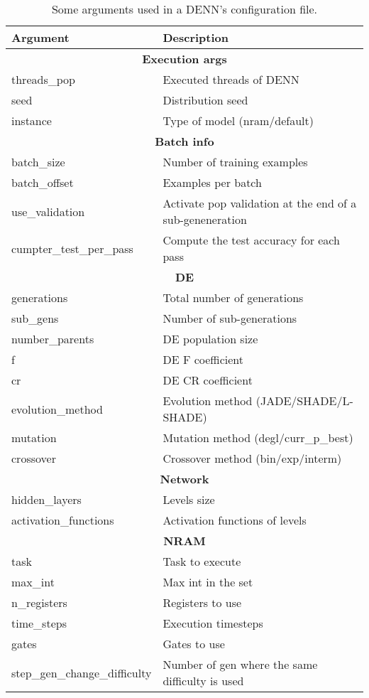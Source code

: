 \begin{table}[]
\centering
\label{my-label}
\begin{tabular}{|l|l|}
\hline
Argument     & Description \\ \hline \hline

\multicolumn{2}{|c|}{\textbf{Execution args}} \\ \hline
threads\_pop & Executed threads of DENN \\ \hline
seed     	 & Distribution seed \\ \hline
instance		 & Type of model (nram/default) \\ \hline \hline

\multicolumn{2}{|c|}{\textbf{Batch info}} \\ \hline
batch\_size  	 & Number of training examples \\ \hline
batch\_offset	 & Examples per batch \\ \hline
use\_validation & Activate pop validation at the end of a sub-geneneration \\ \hline
cumpter\_test\_per\_pass     	 & Compute the test accuracy for each pass \\ \hline \hline

\multicolumn{2}{|c|}{\textbf{DE}} \\ \hline
generations  	 & Total number of generations \\ \hline
sub\_gens  	 	& Number of sub-generations \\ \hline
number\_parents  	 	& DE population size \\ \hline
f						& DE F coefficient \\ \hline
cr						& DE CR coefficient \\ \hline
evolution\_method 		& Evolution method (JADE/SHADE/L-SHADE) \\ \hline
mutation 				& Mutation method (degl/curr\_p\_best) \\ \hline
crossover				& Crossover method (bin/exp/interm) \\ \hline

\multicolumn{2}{|c|}{\textbf{Network}} \\ \hline
hidden\_layers  	 		& Levels size \\ \hline
activation\_functions  	& Activation functions of levels \\ \hline

\multicolumn{2}{|c|}{\textbf{NRAM}} \\ \hline
task  	 		& Task to execute \\ \hline
max\_int  		& Max int in the set \\ \hline
n\_registers  	& Registers to use \\ \hline
time\_steps  	& Execution timesteps \\ \hline
gates  			& Gates to use \\ \hline
step\_gen\_change\_difficulty & Number of gen where the same difficulty is used  \\ \hline

\end{tabular}
\caption{Some arguments used in a DENN's configuration file.}
\label{tbl:denn-parameters}
\end{table}

